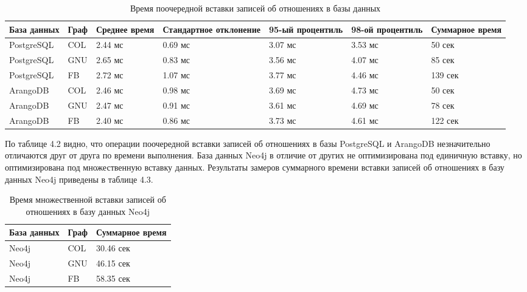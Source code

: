 \begin{table} [htbp]
    \centering\small
    \caption{Время поочередной вставки записей об отношениях в базы данных}
    \begin{tabular}{|p{3cm}|p{1cm}|p{2cm}|p{2cm}|p{2cm}|p{2cm}|p{2cm}|}
        \hline
        База данных & Граф & Среднее время & Стандартное отклонение & 95-ый процентиль & 98-ой процентиль & Суммарное время \\ \hline
        PostgreSQL  & COL  & 2.44 мс       & 0.69 мс                & 3.07 мс          & 3.53 мс          & 50 сек          \\ \hline
        PostgreSQL  & GNU  & 2.65 мс       & 0.83 мс                & 3.56 мс          & 4.07 мс          & 85 сек          \\ \hline
        PostgreSQL  & FB   & 2.72 мс       & 1.07 мс                & 3.77 мс          & 4.46 мс          & 139 сек         \\ \hline
        ArangoDB    & COL  & 2.46 мс       & 0.98 мс                & 3.69 мс          & 4.73 мс          & 50 сек          \\ \hline
        ArangoDB    & GNU  & 2.47 мс       & 0.91 мс                & 3.61 мс          & 4.69 мс          & 78 сек          \\ \hline
        ArangoDB    & FB   & 2.40 мс       & 0.86 мс                & 3.73 мс          & 4.61 мс          & 122 сек         \\ \hline
    \end{tabular}
    \normalsize
\end{table}

По таблице 4.2 видно, что операции поочередной вставки записей об отношениях в базы PostgreSQL и ArangoDB незначительно отличаются друг от
друга по времени выполнения. База данных Neo4j в отличие от других не оптимизирована под единичную вставку, но оптимизирована под
множественную вставку данных. Результаты замеров суммарного времени вставки записей об отношениях в базу данных Neo4j приведены в таблице 4.3.

\begin{table} [htbp]
    \centering\small
    \caption{Время множественной вставки записей об отношениях в базу данных Neo4j}
    \begin{tabular}{|l|l|l|}
        \hline
        База данных & Граф & Суммарное время \\ \hline
        Neo4j       & COL  & 30.46 сек       \\ \hline
        Neo4j       & GNU  & 46.15 сек       \\ \hline
        Neo4j       & FB   & 58.35 сек       \\ \hline
    \end{tabular}
    \normalsize
\end{table}

